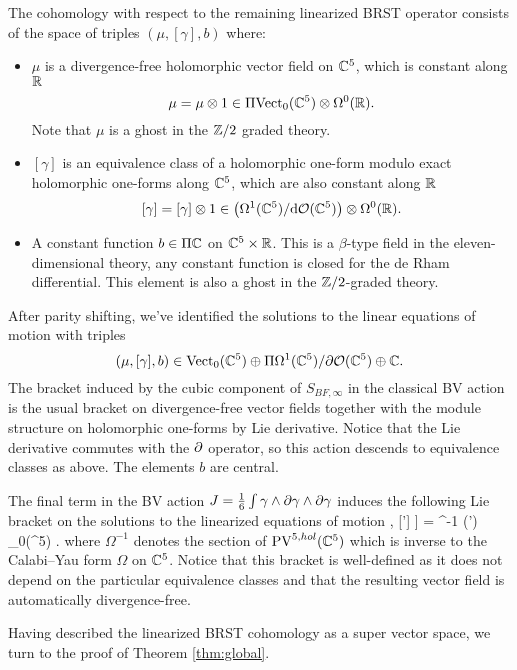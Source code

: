 The cohomology with respect to the remaining linearized BRST operator consists of the space of triples $(\mu, [\gamma], b)$ where:
\begin{itemize}
\item $\mu$ is a divergence-free holomorphic vector field on $\mathbb C^5$, which is constant along $\mathbb R$
\[
\mu = \mu \otimes 1 \in \Pi {\rm Vect}_0(\mathbb C^5) \otimes \Omega^0(\mathbb R) .
\]
Note that $\mu$ is a ghost in the $\mathbb Z/2$ graded theory. 
\item $[\gamma]$ is an equivalence class of a holomorphic one-form modulo exact holomorphic one-forms along $\mathbb C^5$, which are also constant along $\mathbb R$
\[
[\gamma] = [\gamma] \otimes 1 \in \left(\Omega^{1}(\mathbb C^5) / {\rm d} \mathcal O(\mathbb C^5) \right) \otimes \Omega^0(\mathbb R) .
\]
\item A constant function $b \in \Pi \mathbb C$ on $\mathbb C^5 \times \mathbb R$.
This is a $\beta$-type field in the eleven-dimensional theory, any constant function is closed for the de Rham differential. 
This element is also a ghost in the $\mathbb Z/2$-graded theory. 
\end{itemize}

\parsec[]

After parity shifting, we've identified the solutions to the linear equations of motion with triples
\[
(\mu, [\gamma], b) \in {\rm Vect}_0(\mathbb C^5) \oplus \Pi \Omega^{1}(\mathbb C^5) / \partial \mathcal O(\mathbb C^5) \oplus \mathbb C .
\]
The bracket induced by the cubic component of $S_{BF, \infty}$ in the classical BV action is the usual bracket on divergence-free vector fields together with the module structure on holomorphic one-forms by Lie derivative.
Notice that the Lie derivative commutes with the $\partial$ operator, so this action descends to equivalence classes as above. 
The elements $b$ are central. 

The final term in the BV action $J = \frac16\int \gamma \wedge \partial \gamma \wedge \partial \gamma$ induces the following Lie bracket on the solutions to the linearized equations of motion
\beqn\label{eqn:eqb}
\big[[\gamma], [\gamma'] \big] = \Omega^{-1} \vee (\del \gamma \wedge \del \gamma') \in \Vect_0(\CC^5) .
\eeqn
where $\Omega^{-1}$ denotes the section of ${\rm PV}^{5,hol}(\mathbb C^5)$ which is inverse to the Calabi--Yau form $\Omega$ on $\mathbb C^5$. 
Notice that this bracket is well-defined as it does not depend on the particular equivalence classes and that the resulting vector field is automatically divergence-free.

\parsec[]

Having described the linearized BRST cohomology as a super vector space, we turn to the proof of Theorem \ref{thm:global}.

